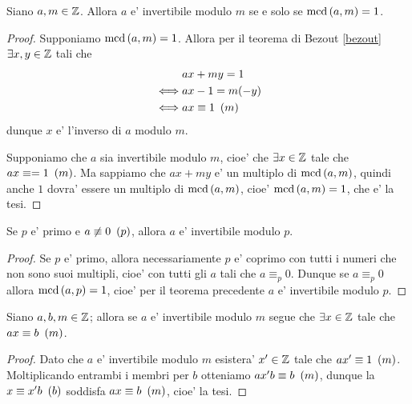 \begin{theorem}
    Siano $a, m \in \mathbb{Z}$. Allora $a$ e' invertibile modulo $m$ se e solo se $\operatorname{mcd}\left(a, m\right) = 1$. 
\end{theorem}
\begin{proof}
    Supponiamo $\operatorname{mcd}\left(a, m\right) = 1$. Allora per il teorema di Bezout \ref{bezout} $\exists x, y \in \mathbb{Z}$ tali che
    \begin{alignat*}{1}
        &ax + my = 1 \\
        \iff &ax - 1 = m(-y) \\
        \iff &ax \equiv 1 \ \left(m\right)
    \end{alignat*}
    dunque $x$ e' l'inverso di $a$ modulo $m$.

    Supponiamo che $a$ sia invertibile modulo $m$, cioe' che $\exists x \in \mathbb{Z}$ tale che $ax \equiv= 1 \ \left(m\right)$. Ma sappiamo che $ax + my$ e' un multiplo di $\operatorname{mcd}\left(a, m\right)$, quindi anche $1$ dovra' essere un multiplo di $\operatorname{mcd}\left(a, m\right)$, cioe' $\operatorname{mcd}\left(a, m\right) = 1$, che e' la tesi.
\end{proof}
\begin{corollary}
    Se $p$ e' primo e $a \not\equiv 0 \ \left(p\right)$, allora $a$ e' invertibile modulo $p$.
\end{corollary}
\begin{proof}
    Se $p$ e' primo, allora necessariamente $p$ e' coprimo con tutti i numeri che non sono suoi multipli, cioe' con tutti gli $a$ tali che $a \equiv_p 0$. Dunque se $a \equiv_p 0$ allora $\operatorname{mcd}\left(a, p\right) = 1$, cioe' per il teorema precedente $a$ e' invertibile modulo $p$.
\end{proof}

\begin{proposition} \label{se_invertibile_allora_soluzione}
    Siano $a, b, m \in \mathbb{Z}$; allora se $a$ e' invertibile modulo $m$ segue che $\exists x \in \mathbb{Z}$ tale che $ax \equiv b \ \left(m\right)$.
\end{proposition}
\begin{proof}
    Dato che $a$ e' invertibile modulo $m$ esistera' $x' \in \mathbb{Z}$ tale che $ax' \equiv 1 \ \left(m\right)$. Moltiplicando entrambi i membri per $b$ otteniamo $ax'b \equiv b \ \left(m\right)$, dunque la $x \equiv x'b \ \left(b\right)$ soddisfa $ax \equiv b \ \left(m\right)$, cioe' la tesi.
\end{proof}

